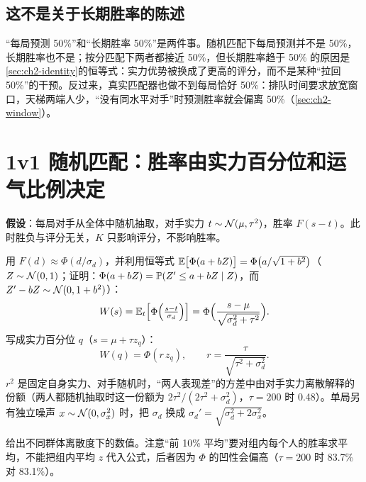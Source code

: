 \subsection{这不是关于长期胜率的陈述}

“每局预测 50\%”和“长期胜率 50\%”是两件事。随机匹配下每局预测并不是 50\%，长期胜率也不是；按分匹配下两者都接近 50\%，但长期胜率趋于 50\% 的原因是\cref{sec:ch2-identity}的恒等式：实力优势被换成了更高的评分，而不是某种“拉回 50\%”的干预。反过来，真实匹配器也做不到每局恰好 50\%：排队时间要求放宽窗口，天梯两端人少，“没有同水平对手”时预测胜率就会偏离 50\%（\cref{sec:ch2-window}）。

\section{1v1 随机匹配：胜率由实力百分位和运气比例决定}
\label{sec:ch2-random}

\textbf{假设}：每局对手从全体中随机抽取，对手实力 $t\sim\mathcal{N}(\mu,\tau^2)$，胜率 $F(s-t)$。此时胜负与评分无关，$K$ 只影响评分，不影响胜率。

\begin{derivbox}[随机匹配的闭式胜率]
用 $F(d)\approx\Phi(d/\sigma_d)$，并利用恒等式 $\mathbb{E}\bigl[\Phi(a+bZ)\bigr]=\Phi\bigl(a/\sqrt{1+b^2}\bigr)$（$Z\sim\mathcal{N}(0,1)$；证明：$\Phi(a+bZ)=\mathbb{P}(Z'\le a+bZ\mid Z)$，而 $Z'-bZ\sim\mathcal{N}(0,1+b^2)$）：
\begin{equation}
  W(s)=\mathbb{E}_t\Bigl[\Phi\Bigl(\tfrac{s-t}{\sigma_d}\Bigr)\Bigr]=\Phi\Bigl(\frac{s-\mu}{\sqrt{\sigma_d^2+\tau^2}}\Bigr).
  \label{eq:ch2-random}
\end{equation}
写成实力百分位 $q$（$s=\mu+\tau z_q$）：
\begin{equation}
  W(q)=\Phi(r\,z_q),\qquad r=\frac{\tau}{\sqrt{\tau^2+\sigma_d^2}}.
  \label{eq:ch2-percentile}
\end{equation}
$r^2$ 是固定自身实力、对手随机时，“两人表现差”的方差中由对手实力离散解释的份额（两人都随机抽取时这一份额为 $2\tau^2/(2\tau^2+\sigma_d^2)$，$\tau=200$ 时 0.48）。单局另有独立噪声 $x\sim\mathcal{N}(0,\sigma_x^2)$ 时，把 $\sigma_d$ 换成 $\sigma_d'=\sqrt{\sigma_d^2+2\sigma_x^2}$。
\end{derivbox}

 给出不同群体离散度下的数值。注意“前 10\% 平均”要对组内每个人的胜率求平均，不能把组内平均 $z$ 代入公式，后者因为 $\Phi$ 的凹性会偏高（$\tau=200$ 时 83.7\% 对 83.1\%）。

